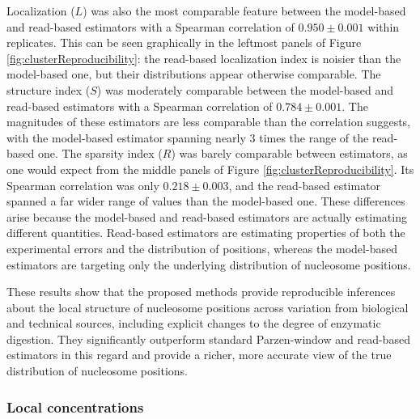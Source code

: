 Localization ($L$) was also the most comparable feature between the model-based and read-based estimators with a Spearman correlation of $0.950\pm0.001$ within replicates.
%
This can be seen graphically in the leftmost panels of Figure \ref{fig:clusterReproducibility}: the read-based localization index is noisier than the model-based one, but their distributions appear otherwise comparable.
%
The structure index ($S$) was moderately comparable between the model-based and read-based estimators with a Spearman correlation of $0.784\pm0.001$.
The magnitudes of these estimators are less comparable than the correlation suggests, with the model-based estimator spanning nearly 3 times the range of the read-based one.
%
The sparsity index ($R$) was barely comparable between estimators, as one would expect from the middle panels of Figure \ref{fig:clusterReproducibility}.
Its Spearman correlation was only $0.218\pm0.003$, and the read-based estimator spanned a far wider range of values than the model-based one.
%
These differences arise because the model-based and read-based estimators are actually estimating different quantities.
Read-based estimators are estimating properties of both the experimental errors and the distribution of positions, whereas the model-based estimators are targeting only the underlying distribution of nucleosome positions.

These results show that the proposed methods provide reproducible inferences about the local structure of nucleosome positions across variation from biological and technical sources, including explicit changes to the degree of enzymatic digestion.
They significantly outperform standard Parzen-window and read-based estimators in this regard and provide a richer, more accurate view of the true distribution of nucleosome positions.

\subsubsection{Local concentrations}
\label{sec:detectionReproducibility}

